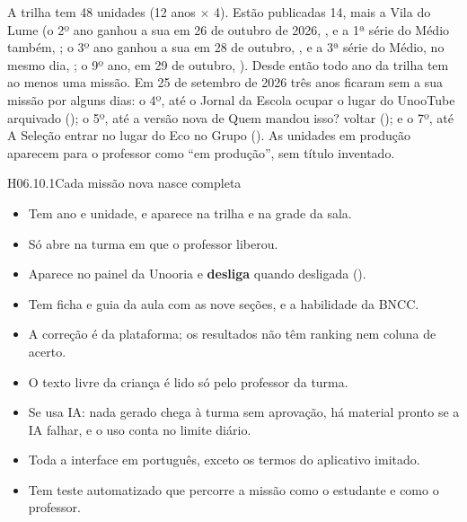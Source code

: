 
A trilha tem 48 unidades (12 anos $\times$ 4). Estão publicadas 14, mais a Vila
do Lume (o 2º ano ganhou a sua em 26 de outubro de 2026, , e a 1ª
série do Médio também, ; o 3º ano ganhou a sua em 28 de outubro, , e a 3ª
série do Médio, no mesmo dia, ; o 9º ano, em 29 de outubro, ). Desde então todo ano da trilha tem ao menos uma missão. Em 25 de setembro de 2026 três anos ficaram sem a sua
missão por alguns dias: o 4º, até o Jornal da Escola ocupar o lugar do UnooTube
arquivado (); o 5º, até a versão nova de Quem mandou isso? voltar
(); e o 7º, até A Seleção entrar no lugar do Eco no Grupo
(). As unidades em produção aparecem para o professor como
\enquote{em produção}, sem título inventado.

\begin{historia}{H06.10.1}{Cada missão nova nasce completa}{\afazer}
\aceiteproposta
\begin{itemize}
  \item Tem ano e unidade, e aparece na trilha e na grade da sala.
  \item Só abre na turma em que o professor liberou.
  \item Aparece no painel da Unooria e \textbf{desliga} quando desligada
    ().
  \item Tem ficha e guia da aula com as nove seções, e a habilidade da BNCC.
  \item A correção é da plataforma; os resultados não têm ranking nem coluna de
    acerto.
  \item O texto livre da criança é lido só pelo professor da turma.
  \item Se usa IA: nada gerado chega à turma sem aprovação, há material pronto
    se a IA falhar, e o uso conta no limite diário.
  \item Toda a interface em português, exceto os termos do aplicativo imitado.
  \item Tem teste automatizado que percorre a missão como o estudante e como o
    professor.
\end{itemize}
\end{historia}

